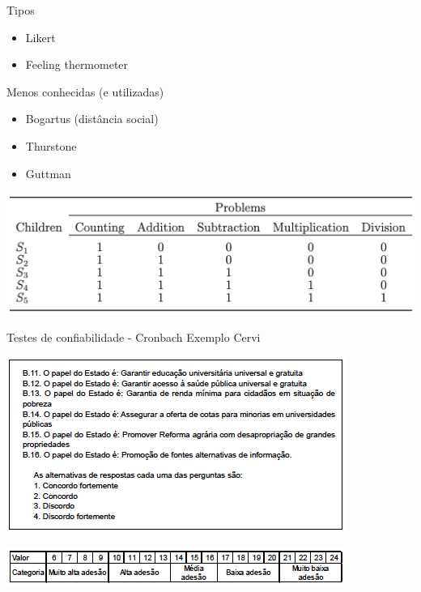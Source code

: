 \documentclass[
  9pt,
  ignorenonframetext,
  aspectratio=169]{beamer}
\begin{document}
\begin{frame}{Tipos}
\protect\hypertarget{tipos}{}
\begin{itemize}
\item
  Likert
\item
  Feeling thermometer
\end{itemize}

Menos conhecidas (e utilizadas)

\begin{itemize}
\item
  Bogartus (distância social)
\item
  Thurstone
\item
  Guttman
\end{itemize}

\includegraphics{imgs/guttman}
\end{frame}

\begin{frame}{Testes de confiabilidade - Cronbach}
\protect\hypertarget{testes-de-confiabilidade---cronbach}{}
Exemplo Cervi

\includegraphics{imgs/excervi1.png}
\end{frame}

\begin{frame}{}
\protect\hypertarget{section-1}{}
\includegraphics{imgs/excervi2.png}
\end{frame}
\end{document}
